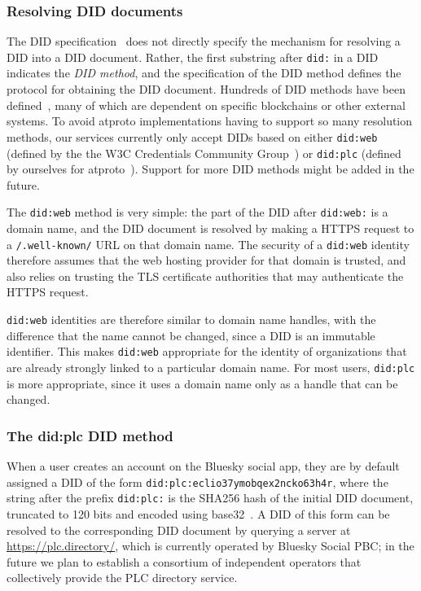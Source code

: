 \documentclass[sigconf]{acmart}
\begin{document}
\subsubsection{Resolving DID documents}

The DID specification~\cite{DIDCore} does not directly specify the mechanism for resolving a DID into a DID document.
Rather, the first substring after \texttt{did:} in a DID indicates the \emph{DID method}, and the specification of the DID method defines the protocol for obtaining the DID document.
Hundreds of DID methods have been defined~\cite{DIDMethods}, many of which are dependent on specific blockchains or other external systems.
To avoid atproto implementations having to support so many resolution methods, our services currently only accept DIDs based on either \texttt{did:web} (defined by the the W3C Credentials Community Group~\cite{did:web}) or \texttt{did:plc} (defined by ourselves for atproto~\cite{did:plc}).
Support for more DID methods might be added in the future.

The \texttt{did:web} method is very simple: the part of the DID after \texttt{did:web:} is a domain name, and the DID document is resolved by making a HTTPS request to a \texttt{/.well-known/} URL on that domain name.
The security of a \texttt{did:web} identity therefore assumes that the web hosting provider for that domain is trusted, and also relies on trusting the TLS certificate authorities that may authenticate the HTTPS request.

\texttt{did:web} identities are therefore similar to domain name handles, with the difference that the name cannot be changed, since a DID is an immutable identifier.
This makes \texttt{did:web} appropriate for the identity of organizations that are already strongly linked to a particular domain name.
For most users, \texttt{did:plc} is more appropriate, since it uses a domain name only as a handle that can be changed.

\subsubsection{The did:plc DID method}

When a user creates an account on the Bluesky social app, they are by default assigned a DID of the form \texttt{did:plc:eclio37ymobqex2ncko63h4r}, where the string after the prefix \texttt{did:plc:} is the SHA256 hash of the initial DID document, truncated to 120 bits and encoded using base32~\cite{did:plc}.
A DID of this form can be resolved to the corresponding DID document by querying a server at \url{https://plc.directory/}, which is currently operated by Bluesky Social PBC; in the future we plan to establish a consortium of independent operators that collectively provide the PLC directory service.
\end{document}
